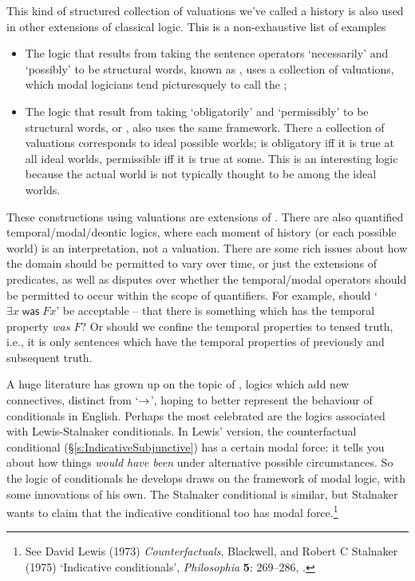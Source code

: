 This kind of structured collection of valuations we've called a history is also used in other extensions of classical logic. This is a non-exhaustive list of examples \begin{itemize}
	\item The logic that results from taking the sentence operators `necessarily' and `possibly' to be structural words, known as , uses a collection of valuations, which modal logicians tend picturesquely to call the ;
	\item The logic that result from taking `obligatorily' and `permissibly' to be structural words, or , also uses the same framework. There a collection of valuations corresponds to ideal possible worlds;  is obligatory iff it is true at all ideal worlds, permissible iff it is true at some. This is an interesting logic because the actual world is not typically thought to be among the ideal worlds. 
\end{itemize} 
These constructions using valuations are extensions of \TFL. There are also quantified temporal/modal/deontic logics, where each moment of history (or each possible world) is an interpretation, not a valuation. There are some rich issues about how the domain should be permitted to vary over time, or just the extensions of predicates, as well as disputes over whether the temporal/modal operators should be permitted to occur within the scope of quantifiers. For example, should `$\exists x \mathop{\mathsf{was}}Fx$' be acceptable – that there is something which has the temporal property \emph{was $F$}? Or should we confine the temporal properties to tensed truth, i.e., it is only sentences which have the temporal properties of previously and subsequent truth.

A huge literature has grown up on the topic of , logics which add new connectives, distinct from `$\rightarrow$', hoping to better represent the behaviour of conditionals in English. Perhaps the most celebrated are the logics associated with Lewis-Stalnaker conditionals. In Lewis' version, the counterfactual conditional (§\ref{s:IndicativeSubjunctive}) has a certain modal force: it tells you about how things \emph{would have been} under alternative possible circumstances. So the logic of conditionals he develops draws on the framework of modal logic, with some innovations of his own. The Stalnaker conditional is similar, but Stalnaker wants to claim that the indicative conditional too has modal force.\footnote{See David Lewis (1973) \emph{Counterfactuals}, Blackwell, and Robert C Stalnaker (1975) ‘Indicative conditionals’, \emph{Philosophia} \textbf{5}: 269–286, .}

